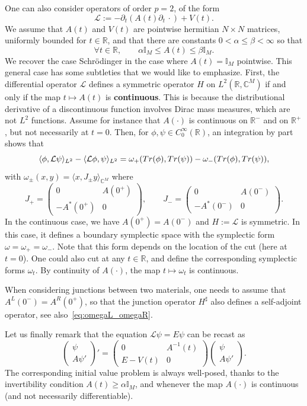 \documentclass[11pt]{amsart}
\numberwithin{equation}{section} %
\newcommand\1{{\mathds 1}}
\def\C{{\mathbb C}}
\def\bbI{{\mathbb I}}
\def\R{{\mathbb R}}
\def\cL{{\mathcal L}}
\def\bra{\langle}
\def\ket{\rangle}
\def\Tr{{\rm Tr}}
\begin{document}
One can also consider operators of order $p = 2$, of the form
\[
    \cL := - \partial_t \left( A(t) \partial_t \, \cdot \right) + V(t).
\]
We assume that $A(t)$ and $V(t)$ are pointwise hermitian $N \times N$ matrices, uniformly bounded for $t \in \R$, and that there are constants $0 < \alpha \le \beta < \infty$ so that
\[
    \forall t \in \R, \qquad \alpha \bbI_M \le A(t) \le \beta \bbI_M.
\]
We recover the case Schrödinger in the case where $A(t) = \bbI_M$ pointwise. This general case has some subtleties that we would like to emphasize. First, the differential operator $\cL$ defines a symmetric operator $H$ on $L^2(\R, \C^M)$ if and only if the map $t \mapsto A(t)$ is {\bf continuous}. This is because the distributional derivative of a discontinuous function involves Dirac mass measures, which are not $L^2$ functions. Assume for instance that $A(\cdot)$ is continuous on $\R^-$ and on $\R^+$, but not necessarily at $t = 0$. Then, for $\phi, \psi \in C^\infty_0(\R)$, an integration by part shows that
\[
    \bra \phi, \cL \psi \ket_{L^2} -  \bra \cL \phi, \psi \ket_{L^2} = \omega_+(\Tr(\phi), \Tr(\psi)) - \omega_-(\Tr(\phi), \Tr(\psi)), 
\]
with $\omega_\pm(x, y) = \bra x, J_\pm y \ket_{\C^M}$ where
\[
    J_+ = \begin{pmatrix}
        0 & A(0^+) \\ - A^*(0^+) & 0
    \end{pmatrix}, \qquad 
    J_- = \begin{pmatrix}
        0 & A(0^-) \\ - A^*(0^-) & 0
    \end{pmatrix}.
\]
In the continuous case, we have $A(0^+) = A(0^-)$ and $H := \cL$ is symmetric. In this case, it defines a boundary symplectic space with the symplectic form $\omega = \omega_+ = \omega_-$. Note that this form depends on the location of the cut (here at $t = 0$). One could also cut at any $t \in \R$, and define the corresponding symplectic forms $\omega_t$. By continuity of $A(\cdot)$, the map $t \mapsto \omega_t$ is continuous.

\medskip

When considering junctions between two materials, one needs to assume that $A^L(0^-) = A^R(0^+)$, so that the junction operator $H^\sharp$ also defines a self-adjoint operator, see also~\eqref{eq:omegaL_omegaR}.

\medskip

Let us finally remark that the equation $\cL \psi = E \psi$ can be recast as 
\[
    \begin{pmatrix}
        \psi \\ 
        A \psi'
    \end{pmatrix}' = \begin{pmatrix}
        0 & A^{-1}(t) \\
        E - V(t) & 0
    \end{pmatrix} \begin{pmatrix}
    \psi \\ 
    A \psi'
    \end{pmatrix}.
\]
The corresponding initial value problem is always well-posed, thanks to the invertibility condition $A(t) \ge \alpha \bbI_M$, and whenever the map $A(\cdot)$ is continuous (and not necessarily differentiable).
\end{document}
